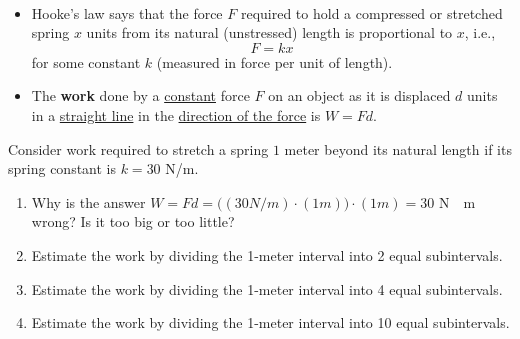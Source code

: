 \newpage

\begin{remark}\,
\begin{itemize}
\item Hooke's law says that the force $F$ required to hold a compressed or stretched spring $x$ units from its natural (unstressed) length is proportional to $x$, i.e.,
\begin{equation*}
F=kx
\end{equation*}
for some constant $k$ (measured in force per unit of length).
\item The \textbf{work} done by a \underline{constant} force $F$ on an object as it is displaced $d$ units in a \underline{straight line} in the \underline{direction of the force} is $W=Fd$.
\end{itemize}
\end{remark}

\begin{example}
Consider work required to stretch a spring $1$ meter beyond its natural length if its spring constant is $k=30$ \si{N/m}.
\begin{enumerate}[label=(\alph*)]
\item Why is the answer $W = Fd = \big((30 \si{N/m})\cdot (1 \si{m})\big)\cdot (1 \si{m}) = 30$ \si{N\cdot m} wrong? Is it too big or too little?
\vfill
\item Estimate the work by dividing the 1-meter interval into 2 equal subintervals.
\vspace{5.5in}
\newpage
\item Estimate the work by dividing the 1-meter interval into 4 equal subintervals.
\vfill
\item Estimate the work by dividing the 1-meter interval into 10 equal subintervals.
\vfill
\end{enumerate}
\end{example}

\newpage

